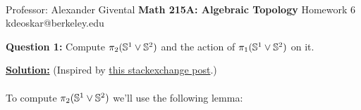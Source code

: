 \documentclass[11pt]{article}
\begin{document}
\thispagestyle{empty}
\bigskip \
\vspace{0.1cm}

\begin{center}
{\fontsize{22}{22} \selectfont Professor: Alexander Givental}
\vskip 16pt
{\fontsize{30}{30} \selectfont \bf \sffamily Math 215A: Algebraic Topology}
\vskip 24pt
{\fontsize{14}{14} \selectfont \rmfamily Homework 6} 
\vskip 6pt
{\fontsize{14}{14} \selectfont \ttfamily kdeoskar@berkeley.edu} 
\vskip 24pt
\end{center}




\begin{bluebox}
  \textbf{Question 1:} Compute $\pi_2(\mathbb{S}^1 \vee \mathbb{S}^2)$ and the action of $\pi_1(\mathbb{S}^1 \vee \mathbb{S}^2)$ on it.
\end{bluebox}

\vskip 0.5cm
\textbf{\underline{Solution:}} (Inspired by \href{https://math.stackexchange.com/questions/1675337/calculate-pi-2s2-vee-s1}{this stackexchange post}.)
\\
\\
To compute $\pi_2(\mathbb{S}^1 \vee \mathbb{S}^2)$ we'll use the following lemma:
\end{document}
